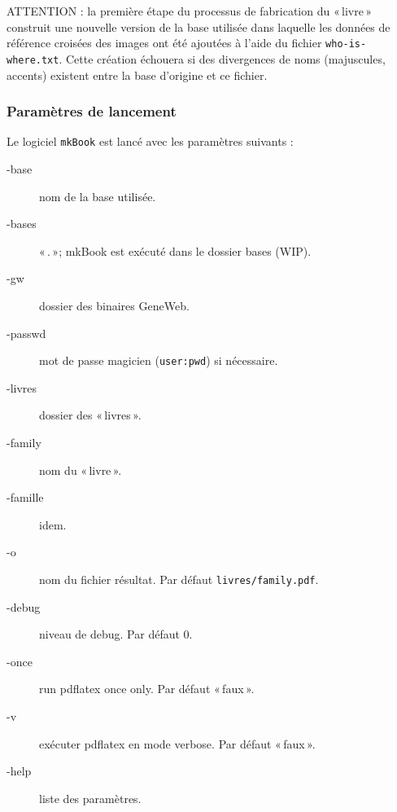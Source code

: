 ATTENTION : la première étape du processus de fabrication du «\,livre\,»
construit une nouvelle version de la base utilisée dans laquelle les
données de référence croisées des images ont été ajoutées à l'aide du
fichier \verb|who-is-where.txt|.
Cette création échouera si des divergences de noms (majuscules, accents)
existent entre la base d'origine et ce fichier.

\subsubsection{Paramètres de lancement}

Le logiciel \verb|mkBook| est lancé avec les paramètres suivants :
\begin{description}
\item[-base] nom de la base utilisée.
\item[-bases] «\,.\,»; mkBook est exécuté dans le dossier bases (WIP).
\item[-gw] dossier des binaires GeneWeb.
\item[-passwd] mot de passe magicien (\verb|user:pwd|) si nécessaire.
\item[-livres] dossier des «\,livres\,».
\item[-family] nom du «\,livre\,».
\item[-famille] idem.
\item[-o] nom du fichier résultat. Par défaut \verb|livres/family.pdf|.
\item[-debug] niveau de debug. Par défaut 0.
\item[-once] run pdflatex once only. Par défaut «\,faux\,».
\item[-v] exécuter pdflatex en mode verbose. Par défaut «\,faux\,».
\item[-help] liste des paramètres.
\end{description}

